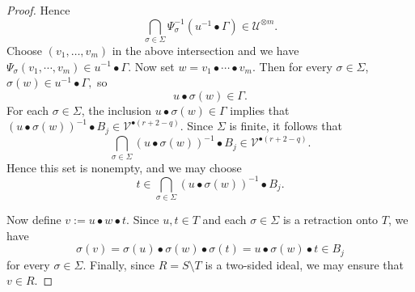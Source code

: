 \documentclass[12pt]{amsart}
\begin{document}
\begin{proof}
Hence
\[
\bigcap_{\sigma \in \Sigma} \Psi_\sigma^{-1}(u^{-1} \bullet \Gamma) \in \mathcal{U}^{\otimes m}.
\]
Choose $(v_1,\dots,v_m)$ in the above intersection and we have $\Psi_{\sigma}(v_1, \cdots , v_m) \in u^{-1} \bullet \Gamma.$ Now set $w = v_1 \bullet \cdots \bullet v_m$. Then for every $\sigma \in \Sigma$, $\sigma(w) \in u^{-1} \bullet \Gamma,$
so
\[
u \bullet \sigma(w) \in \Gamma.
\]
For each $\sigma\in\Sigma$, the inclusion $u \bullet \sigma(w)\in\Gamma$ implies that $(u \bullet \sigma(w))^{-1} \bullet B_j\in\mathcal{V}^{\bullet(r+2-q)}.
$
Since $\Sigma$ is finite, it follows that
\[
\bigcap_{\sigma\in\Sigma}(u \bullet \sigma(w))^{-1} \bullet B_j
\in\mathcal{V}^{\bullet(r+2-q)}.
\]
Hence this set is nonempty, and we may choose
\[
t\in \bigcap_{\sigma\in\Sigma}(u \bullet \sigma(w))^{-1} \bullet B_j.
\]



Now define $v:=u \bullet w \bullet t.$ Since $u,t\in T$ and each $\sigma\in\Sigma$ is a retraction onto $T$, we have 
\[
\sigma(v)=\sigma(u) \bullet \sigma(w) \bullet \sigma(t)=u \bullet \sigma(w) \bullet t\in B_j
\]
for every $\sigma\in\Sigma$. Finally, since $R = S \setminus T$ is a two-sided ideal, we may ensure that $v \in R$.
\end{proof}
\end{document}
